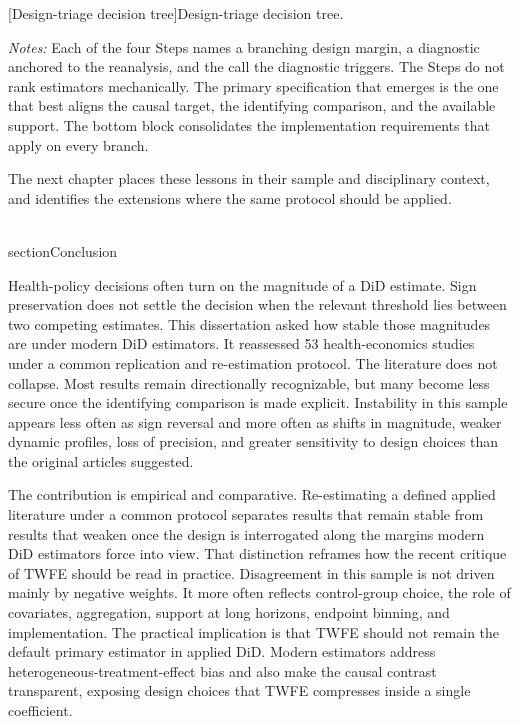 \documentclass[11pt]{article}
\begin{document}
\begin{landscape}
[Design-triage decision tree]{Design-triage decision tree.}
\label{fig:decision_tree}
{\footnotesize\textit{Notes:} Each of the four Steps names a branching design margin, a diagnostic anchored to the reanalysis, and the call the diagnostic triggers. The Steps do not rank estimators mechanically. The primary specification that emerges is the one that best aligns the causal target, the identifying comparison, and the available support. The bottom block consolidates the implementation requirements that apply on every branch.\par}
\end{landscape}
\clearpage

The next chapter places these lessons in their sample and disciplinary context, and identifies the extensions where the same protocol should be applied.

\\section{Conclusion}
\label{Chapter5}


Health-policy decisions often turn on the magnitude of a DiD estimate. Sign preservation does not settle the decision when the relevant threshold lies between two competing estimates. This dissertation asked how stable those magnitudes are under modern DiD estimators. It reassessed 53 health-economics studies under a common replication and re-estimation protocol. The literature does not collapse. Most results remain directionally recognizable, but many become less secure once the identifying comparison is made explicit. Instability in this sample appears less often as sign reversal and more often as shifts in magnitude, weaker dynamic profiles, loss of precision, and greater sensitivity to design choices than the original articles suggested.

The contribution is empirical and comparative. Re-estimating a defined applied literature under a common protocol separates results that remain stable from results that weaken once the design is interrogated along the margins modern DiD estimators force into view. That distinction reframes how the recent critique of TWFE should be read in practice. Disagreement in this sample is not driven mainly by negative weights. It more often reflects control-group choice, the role of covariates, aggregation, support at long horizons, endpoint binning, and implementation. The practical implication is that TWFE should not remain the default primary estimator in applied DiD. Modern estimators address heterogeneous-treatment-effect bias and also make the causal contrast transparent, exposing design choices that TWFE compresses inside a single coefficient.
\end{document}
